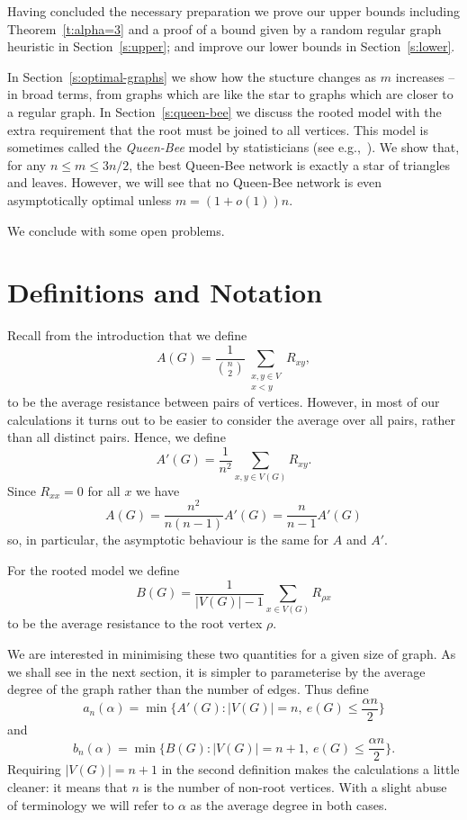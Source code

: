 \documentclass[11pt]{article}
\theoremstyle{remark}
\def\a{\alpha}
\begin{document}
Having concluded the necessary preparation we prove our upper bounds
including Theorem~\ref{t:alpha=3} and a proof of a bound given by a
random regular graph heuristic in Section~\ref{s:upper}; and improve
our lower bounds in Section~\ref{s:lower}.

In Section~\ref{s:optimal-graphs} we show how the stucture changes as
$m$ increases -- in broad terms, from graphs which are like the star
to graphs which are closer to a regular graph.  In
Section~\ref{s:queen-bee} we discuss the rooted model with the extra
requirement that the root must be joined to all vertices. This model
is sometimes called the \emph{Queen-Bee} model by statisticians (see
e.g.,~\cite{MR3026766}). We show that, for any $n\le m\le 3n/2$, the
best Queen-Bee network is exactly a star of triangles and
leaves. However, we will see that no Queen-Bee network is even
asymptotically optimal unless $m=(1+o(1))n$.

We conclude with some open problems.



\section{Definitions and
  Notation}\label{s:defns} Recall from the introduction that we define
\[
A(G)=\frac{1}{\binom{n}{2}}\sum_{\substack{x,y\in V\\ x<y}}R_{xy},
\]
to be the average resistance between pairs of vertices. However, in
most of our calculations it turns out to be easier to consider the
average over all pairs, rather than all distinct pairs. Hence, we define
\[
A'(G)=\frac{1}{n^2}\sum_{x,y\in V(G)}R_{xy}. 
\]
Since $R_{xx}=0$ for all $x$ we have
\[A(G)=\frac{n^2}{n(n-1)}A'(G)=\frac{n}{n-1}A'(G)
\]
so, in particular, the asymptotic behaviour is the same for $A$ and
$A'$.


For the rooted model we define
\[
B(G)=\frac{1}{|V(G)|-1}\sum_{x\in V(G)}R_{\rho x}
\]
to be the average resistance to the root vertex $\rho$.


We are interested in minimising these two quantities for a given size
of graph. As we shall see in the next section, it is simpler to
parameterise by the average degree of the graph rather than the number
of edges. Thus define
\[
a_n(\a)=\min\{A'(G) : |V(G)|=n,\ e(G)\le \frac{\alpha n}{2}\}
\]
and 
\[
b_n(\a)=\min\{B(G) : |V(G)|=n+1,\ e(G)\le \frac{\alpha n}{2}\}.
\]
Requiring $|V(G)|=n+1$ in the second definition makes the calculations
a little cleaner: it means that $n$ is the number of non-root
vertices. With a slight abuse of terminology we will refer to $\alpha$
as the average degree in both cases.
\end{document}
